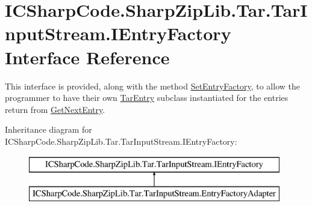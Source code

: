 \hypertarget{interface_i_c_sharp_code_1_1_sharp_zip_lib_1_1_tar_1_1_tar_input_stream_1_1_i_entry_factory}{}\section{I\+C\+Sharp\+Code.\+Sharp\+Zip\+Lib.\+Tar.\+Tar\+Input\+Stream.\+I\+Entry\+Factory Interface Reference}
\label{interface_i_c_sharp_code_1_1_sharp_zip_lib_1_1_tar_1_1_tar_input_stream_1_1_i_entry_factory}


This interface is provided, along with the method \hyperlink{class_i_c_sharp_code_1_1_sharp_zip_lib_1_1_tar_1_1_tar_input_stream_a9d78240fd9fa35d7855939ab89c84e47}{Set\+Entry\+Factory}, to allow the programmer to have their own \hyperlink{class_i_c_sharp_code_1_1_sharp_zip_lib_1_1_tar_1_1_tar_entry}{Tar\+Entry} subclass instantiated for the entries return from \hyperlink{class_i_c_sharp_code_1_1_sharp_zip_lib_1_1_tar_1_1_tar_input_stream_ad1c9380146d8de1f637e7a41868b765d}{Get\+Next\+Entry}.  


Inheritance diagram for I\+C\+Sharp\+Code.\+Sharp\+Zip\+Lib.\+Tar.\+Tar\+Input\+Stream.\+I\+Entry\+Factory\+:\begin{figure}[H]
\begin{center}
\leavevmode
\includegraphics[height=2.000000cm]{interface_i_c_sharp_code_1_1_sharp_zip_lib_1_1_tar_1_1_tar_input_stream_1_1_i_entry_factory}
\end{center}
\end{figure}
